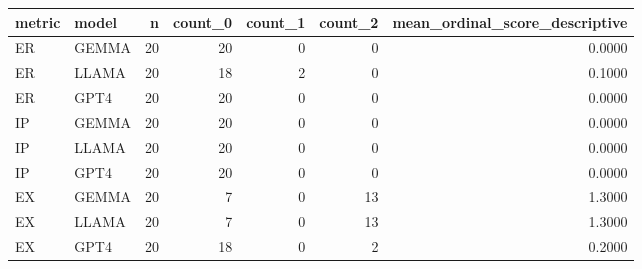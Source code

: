 \begin{tabular}{llrrrrr}
\toprule
metric & model & n & count\_0 & count\_1 & count\_2 & mean\_ordinal\_score\_descriptive \\
\midrule
ER & GEMMA & 20 & 20 & 0 & 0 & 0.0000 \\
ER & LLAMA & 20 & 18 & 2 & 0 & 0.1000 \\
ER & GPT4 & 20 & 20 & 0 & 0 & 0.0000 \\
IP & GEMMA & 20 & 20 & 0 & 0 & 0.0000 \\
IP & LLAMA & 20 & 20 & 0 & 0 & 0.0000 \\
IP & GPT4 & 20 & 20 & 0 & 0 & 0.0000 \\
EX & GEMMA & 20 & 7 & 0 & 13 & 1.3000 \\
EX & LLAMA & 20 & 7 & 0 & 13 & 1.3000 \\
EX & GPT4 & 20 & 18 & 0 & 2 & 0.2000 \\
\bottomrule
\end{tabular}
